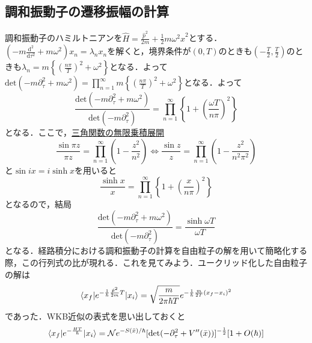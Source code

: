 \documentclass[a4paper,11pt]{jsarticle}
\begin{document}
\subsection*{調和振動子の遷移振幅の計算}
調和振動子のハミルトニアンを$\hat{H}=\frac{\hat{p}^2}{2m}+\frac{1}{2}m\omega^2\hat{x}^2$とする．$\left(-m\frac{\mathrm{d}^2}{\mathrm{d}\tau^2}+m\omega^2\right)x_n=\lambda_n x_n$を解くと，境界条件が$(0,T)$のときも$(-\frac{T}{2},\frac{T}{2})$のときも$\lambda_n=m\left\{\left(\frac{n\pi}{T}\right)^2+\omega^2\right\}$となる．よって$\displaystyle \mathrm{det}(-m\partial_\tau^2+m\omega^2)=\prod_{n=1}^\infty m\left\{\left(\frac{n\pi}{T}\right)^2+\omega^2\right\}$となる．よって
\begin{equation*}
\frac{\mathrm{det}(-m\partial_\tau^2+m\omega^2)}{\mathrm{det}(-m\partial_\tau^2)}=\prod_{n=1}^\infty\left\{1+\left(\frac{\omega T}{n\pi}\right)^2\right\}
\end{equation*}
となる．ここで，\href{https://ja.wikipedia.org/wiki/\%E4\%B8\%89\%E8\%A7\%92\%E9\%96\%A2\%E6\%95\%B0\%E3\%81\%AE\%E7\%84\%A1\%E9\%99\%90\%E4\%B9\%97\%E7\%A9\%8D\%E5\%B1\%95\%E9\%96\%8B}{三角関数の無限乗積展開}
\begin{equation*}
\frac{\sin{\pi z}}{\pi z}=\prod_{n=1}^\infty\left(1-\frac{z^2}{n^2}\right) \Longleftrightarrow \frac{\sin{z}}{z}=\prod_{n=1}^\infty\left(1-\frac{z^2}{n^2\pi^2}\right)
\end{equation*}
と$\sin{ix}=i\sinh{x}$を用いると
\begin{equation*}
\frac{\sinh{x}}{x}=\prod_{n=1}^\infty\left\{1+\left(\frac{x}{n\pi}\right)^2\right\}
\end{equation*}
となるので，結局
\begin{equation*}
\frac{\mathrm{det}(-m\partial_\tau^2+m\omega^2)}{\mathrm{det}(-m\partial_\tau^2)}=\frac{\sinh{\omega T}}{\omega T}
\end{equation*}
となる．経路積分における調和振動子の計算を自由粒子の解を用いて簡略化する際，この行列式の比が現れる．これを見てみよう．ユークリッド化した自由粒子の解は
\begin{equation*}
\braket{x_f|e^{-\frac{1}{\hbar}\frac{\hat{p}^2}{2m}T}|x_i}=\sqrt{\frac{m}{2\pi\hbar T}}e^{-\frac{1}{\hbar}\frac{m}{2T}(x_f-x_i)^2}
\end{equation*}
であった．WKB近似の表式を思い出しておくと
\begin{equation*}
\braket{x_f|e^{-\frac{HT}{\hbar}}|x_i}=\mathcal{N}e^{-S(\bar{x})/\hbar}[\mathrm{det}(-\partial_\tau^2+V''(\bar{x}))]^{-\frac{1}{2}}[1+O(\hbar)]
\end{equation*}
\end{document}
